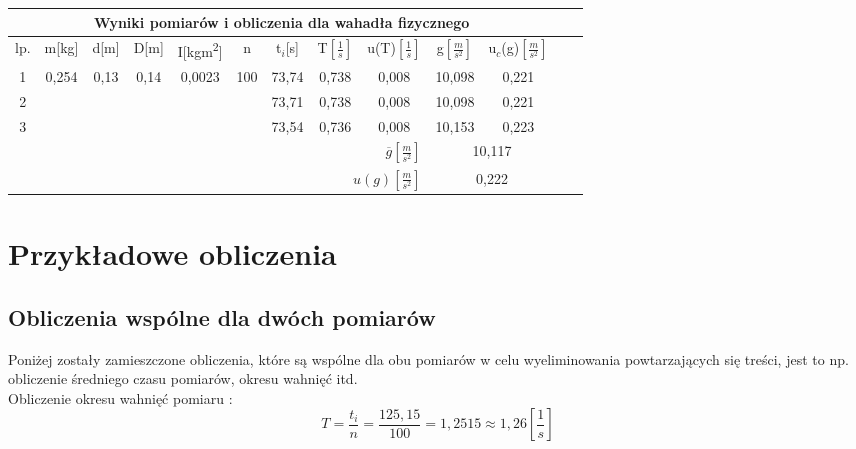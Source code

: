 \documentclass[12pt]{article}
\begin{document}
\begin{table}[!htbp]
    \centering
    \begin{adjustbox}{width=1\textwidth}
    \begin{tabular}{|c|c|c|c|c|c|c|c|c|c|c|c|c|}
    \hline
    \multicolumn{11}{|c|}{Wyniki pomiarów i obliczenia dla wahadła fizycznego} \\
    \hline
    lp. & m[kg] & d[m] & D[m] & I[kgm\textsuperscript{2}] & n & t$_i$[s] & T$\left[\frac{1}{s} \right]$  & u(T)$\left[\frac{1}{s} \right]$ & g$\left[\frac{m}{s^2}\right]$ & u$_c$(g)$\left[ \frac{m}{s^2} \right]$ 
    \\[10pt]
    \hline
    1 & \multirow{3}{*}{0,254} & \multirow{3}{*}{0,13} & \multirow{3}{*}{0,14} & \multirow{3}{*}{0,0023} & \multirow{3}{*}{100} & 73,74 & 0,738 & 0,008 & 10,098 & 0,221 \\
    \cline{7-11}
    2 &  & ~ & ~ & ~ & ~ & 73,71 & 0,738 & 0,008 & 10,098 & 0,221 \\
    \cline{7-11}
    3 &  & ~ & ~ & ~ & ~ & 73,54 & 0,736 & 0,008 & 10,153 & 0,223 \\ \hline
    \multicolumn{9}{|r|}{$\overline{g}\left[ \frac{m}{s^2} \right]$} & \multicolumn{2}{|c|}{10,117} \\ \hline
    \multicolumn{9}{|r|}{$u(g)\left[ \frac{m}{s^2} \right]$} & \multicolumn{2}{|c|}{0,222} \\ \hline
    \end{tabular}
\end{adjustbox}
\end{table}



\section{Przykładowe obliczenia}

\subsection{Obliczenia wspólne dla dwóch pomiarów}

Poniżej zostały zamieszczone obliczenia, które są wspólne dla obu pomiarów w celu wyeliminowania powtarzających się treści, jest to np.
obliczenie średniego czasu pomiarów, okresu wahnięć itd. \\

Obliczenie okresu wahnięć pomiaru :
$$ T = \frac{t_i}{n} = \frac{125,15}{100} = 1,2515 \approx 1,26 \left[ \frac{1}{s} \right] $$
\end{document}
